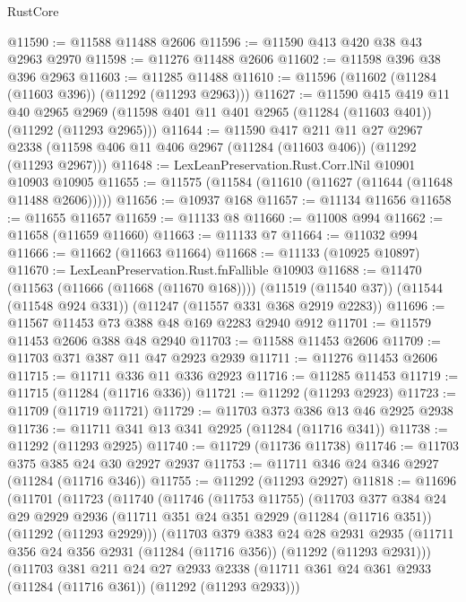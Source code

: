 \begin{lexlean}{RustCore}
\begin{coremodule}
@11590 := @11588 @11488 @2606
@11596 := @11590 @413 @420 @38 @43 @2963 @2970
@11598 := @11276 @11488 @2606
@11602 := @11598 @396 @38 @396 @2963
@11603 := @11285 @11488
@11610 := @11596 (@11602 (@11284 (@11603 @396)) (@11292 (@11293 @2963)))
@11627 := @11590
    @415
    @419
    @11
    @40
    @2965
    @2969
    (@11598 @401 @11 @401 @2965 (@11284 (@11603 @401)) (@11292 (@11293 @2965)))
@11644 := @11590
    @417
    @211
    @11
    @27
    @2967
    @2338
    (@11598 @406 @11 @406 @2967 (@11284 (@11603 @406)) (@11292 (@11293 @2967)))
@11648 := LexLeanPreservation.Rust.Corr.lNil @10901 @10903 @10905
@11655 := @11575 (@11584 (@11610 (@11627 (@11644 (@11648 @11488 @2606)))))
@11656 := @10937 @168
@11657 := @11134 @11656
@11658 := @11655 @11657
@11659 := @11133 @8
@11660 := @11008 @994
@11662 := @11658 (@11659 @11660)
@11663 := @11133 @7
@11664 := @11032 @994
@11666 := @11662 (@11663 @11664)
@11668 := @11133 (@10925 @10897)
@11670 := LexLeanPreservation.Rust.fnFallible @10903
@11688 := @11470
    (@11563 (@11666 (@11668 (@11670 @168))))
    (@11519 (@11540 @37))
    (@11544 (@11548 @924 @331))
    (@11247 (@11557 @331 @368 @2919 @2283))
@11696 := @11567 @11453 @73 @388 @48 @169 @2283 @2940 @912
@11701 := @11579 @11453 @2606 @388 @48 @2940
@11703 := @11588 @11453 @2606
@11709 := @11703 @371 @387 @11 @47 @2923 @2939
@11711 := @11276 @11453 @2606
@11715 := @11711 @336 @11 @336 @2923
@11716 := @11285 @11453
@11719 := @11715 (@11284 (@11716 @336))
@11721 := @11292 (@11293 @2923)
@11723 := @11709 (@11719 @11721)
@11729 := @11703 @373 @386 @13 @46 @2925 @2938
@11736 := @11711 @341 @13 @341 @2925 (@11284 (@11716 @341))
@11738 := @11292 (@11293 @2925)
@11740 := @11729 (@11736 @11738)
@11746 := @11703 @375 @385 @24 @30 @2927 @2937
@11753 := @11711 @346 @24 @346 @2927 (@11284 (@11716 @346))
@11755 := @11292 (@11293 @2927)
@11818 := @11696
    (@11701
      (@11723
        (@11740
          (@11746
            (@11753 @11755)
            (@11703
              @377
              @384
              @24
              @29
              @2929
              @2936
              (@11711 @351 @24 @351 @2929 (@11284 (@11716 @351)) (@11292 (@11293 @2929)))
              (@11703
                @379
                @383
                @24
                @28
                @2931
                @2935
                (@11711 @356 @24 @356 @2931 (@11284 (@11716 @356)) (@11292 (@11293 @2931)))
                (@11703
                  @381
                  @211
                  @24
                  @27
                  @2933
                  @2338
                  (@11711 @361 @24 @361 @2933 (@11284 (@11716 @361)) (@11292 (@11293 @2933)))

\end{coremodule}
\end{lexlean}
